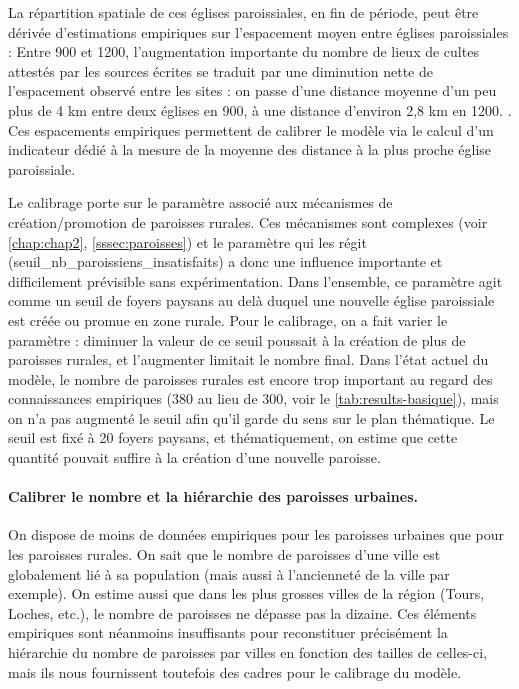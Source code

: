 La répartition spatiale de ces églises paroissiales, en fin de période, peut être dérivée d'estimations empiriques sur l'espacement moyen entre églises paroissiales :
\og Entre 900 et 1200, l'augmentation importante du nombre de lieux de cultes attestés par les sources écrites se traduit par une diminution nette de l'espacement observé entre les sites : on passe d'une distance moyenne d'un peu plus de 4 km entre deux églises en 900, à une distance d'environ 2,8 km en 1200.\fg{} \autocite[261]{chareille_dynamiques_2008}.
Ces espacements empiriques permettent de calibrer le modèle via le calcul d'un indicateur dédié à la mesure de la moyenne des distance à la plus proche église paroissiale.


Le calibrage porte sur le paramètre associé aux mécanismes de création/promotion de paroisses rurales.
Ces mécanismes sont complexes (voir \cref{chap:chap2}, \cref{sssec:paroisses}) et le paramètre qui les régit (\textsf{seuil\_nb\_paroissiens\_insatisfaits}) a donc une influence importante et difficilement prévisible sans expérimentation.
Dans l'ensemble, ce paramètre agit comme un seuil de foyers paysans au delà duquel une nouvelle église paroissiale est créée ou promue en zone rurale.
Pour le calibrage, on a fait varier le paramètre : diminuer la valeur de ce seuil poussait à la création de plus de paroisses rurales, et l'augmenter limitait le nombre final.
Dans l'état actuel du modèle, le nombre de paroisses rurales est encore trop important au regard des connaissances empiriques (380 au lieu de 300, voir le \vref{tab:results-basique}), mais on n'a pas augmenté le seuil afin qu'il garde du sens sur le plan thématique.
Le seuil est fixé à 20 foyers paysans, et thématiquement, on estime que cette quantité pouvait suffire à la création d'une nouvelle paroisse.

\paragraph{Calibrer le nombre et la hiérarchie des paroisses \og urbaines\fg{}.}

On dispose de moins de données empiriques pour les paroisses urbaines que pour les paroisses rurales.
On sait que le nombre de paroisses d'une ville est globalement lié à sa population (mais aussi à l'ancienneté de la ville par exemple).
On estime aussi que dans les plus grosses villes de la région (Tours, Loches, etc.), le nombre de paroisses ne dépasse pas la dizaine.
Ces éléments empiriques sont néanmoins insuffisants pour reconstituer précisément la hiérarchie du nombre de paroisses par villes en fonction des tailles de celles-ci, mais ils nous fournissent toutefois des cadres pour le calibrage du modèle.

